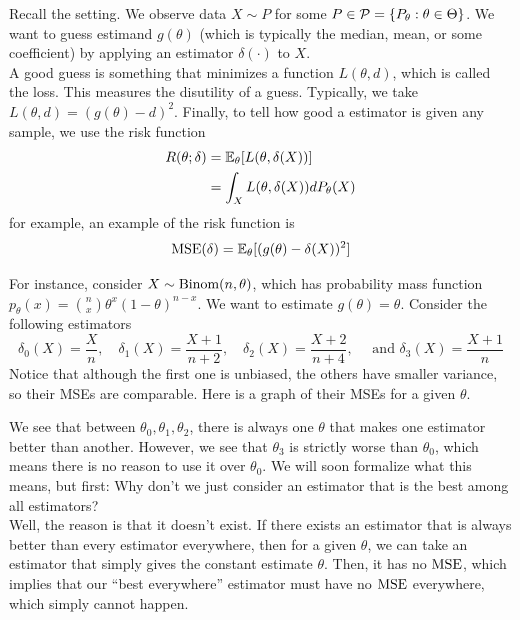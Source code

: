 
Recall the setting. We observe data $X \sim P$ for some $P \in \cal{P} = \{P_{\theta} : \theta \in \Theta\}$. We want to guess estimand $g(\theta)$ (which is typically the median, mean, or some coefficient) by applying an estimator $\delta(\cdot)$ to $X$.\\

A good guess is something that minimizes a function $L(\theta, d)$, which is called the loss. This measures the disutility of a guess. Typically, we take $L(\theta, d) = (g(\theta) - d)^2$. Finally, to tell how good a estimator is given any sample, we use the risk function
\begin{align*}
    R(\theta; \delta) &= \bb{E}_{\theta}[L(\theta, \delta(X))]\\
    &= \int_{X} L(\theta, \delta(X))dP_{\theta}(X)
\end{align*}
for example, an example of the risk function is
\[ \tt{MSE}(\delta) = \bb{E}_{\theta}[(g(\theta) - \delta(X))^2] \]

For instance, consider $X \sim \tt{Binom}(n, \theta)$, which has probability mass function $p_{\theta}(x) = {n \choose x}\theta^{x}(1 - \theta)^{n - x}$. We want to estimate $g(\theta) = \theta$. Consider the following estimators
\[ \delta_0(X) = \frac{X}{n},\quad \delta_1(X) = \frac{X + 1}{n + 2},\quad \delta_2(X) = \frac{X + 2}{n + 4},\quad \text{ and } \delta_{3}(X) = \frac{X + 1}{n} \]
Notice that although the first one is unbiased, the others have smaller variance, so their MSEs are comparable. Here is a graph of their MSEs for a given $\theta$. 


We see that between $\theta_0, \theta_1, \theta_2$, there is always one $\theta$ that makes one estimator better than another. However, we see that $\theta_3$ is strictly worse than $\theta_0$, which means there is no reason to use it over $\theta_0$. We will soon formalize what this means, but first: Why don't we just consider an estimator that is the best among all estimators?\\

Well, the reason is that it doesn't exist. If there exists an estimator that is always better than every estimator everywhere, then for a given $\theta$, we can take an estimator that simply gives the constant estimate $\theta$. Then, it has no $\tt{MSE}$, which implies that our ``best everywhere'' estimator must have no $\tt{MSE}$ everywhere, which simply cannot happen. 

